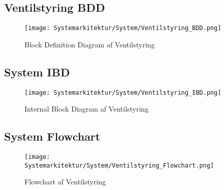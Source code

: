 
\subsection{Ventilstyring BDD}

\begin{figure}[H]
	\centering
	\texttt{[image: Systemarkitektur/System/Ventilstyring\_BDD.png]}
	\label{fig:Ventilstyring BDD}
	\caption{Block Definition Diagram af Ventilstyring}
\end{figure}



\subsection{System IBD}

\begin{figure}[H]
	\centering
	\texttt{[image: Systemarkitektur/System/Ventilstyring\_IBD.png]}
	\label{fig:Ventilstyring IBD}
	\caption{Internal Block Diagram af Ventilstyring}
\end{figure}



\subsection{System Flowchart}

\begin{figure}[H]
	\centering
	\texttt{[image: Systemarkitektur/System/Ventilstyring\_Flowchart.png]}
	\label{fig:Ventilstyring FC}
	\caption{Flowchart af Ventilstyring}
\end{figure}